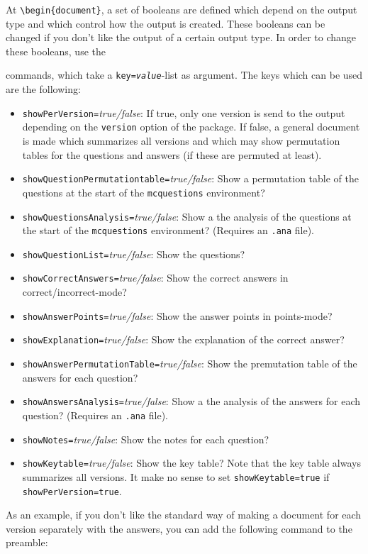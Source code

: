 \documentclass{article}
\begin{document}
At \verb$\begin{document}$, a set of booleans are defined which depend on the output type and which control how the output is created. These booleans can be changed if you don't like the output of a certain output type. In order to change these booleans, use the 
\begin{code}[commandchars=\!\?\;]
\end{code}
commands, which take a \texttt{key=\textit{value}}-list as argument. The keys which can be used are the following:
\begin{itemize}
\item \verb$showPerVersion=$\emph{true/false}: 
      If true, only one version is send to the output depending on the \verb$version$ option of the package. If false, a general document is made which summarizes all versions and which may show permutation tables for the questions and answers (if these are permuted at least). 
\item \verb$showQuestionPermutationtable=$\emph{true/false}:
      Show a permutation table of the questions at the start of the \verb$mcquestions$ environment?
\item \verb$showQuestionsAnalysis=$\emph{true/false}:
      Show a the analysis of the questions at the start of the \verb$mcquestions$ environment? (Requires an \verb$.ana$ file).
\item \verb$showQuestionList=$\emph{true/false}:
      Show the questions?
\item \verb$showCorrectAnswers=$\emph{true/false}:
      Show the correct answers in correct/incorrect-mode?
\item \verb$showAnswerPoints=$\emph{true/false}:
      Show the answer points in points-mode?
\item \verb$showExplanation=$\emph{true/false}:
      Show the explanation of the correct answer?
\item \verb$showAnswerPermutationTable=$\emph{true/false}:
      Show the premutation table of the answers for each question?
\item \verb$showAnswersAnalysis=$\emph{true/false}:
      Show a the analysis of the answers for each question? (Requires an \verb$.ana$ file).
\item \verb$showNotes=$\emph{true/false}:
      Show the notes for each question?
\item \verb$showKeytable=$\emph{true/false}:
      Show the key table? Note that the key table always summarizes all versions. It make no sense to set \verb$showKeytable=true$ if \verb$showPerVersion=true$.
\end{itemize}
As an example, if you don't like the standard way of making a document for each version separately with the answers, you can add the following command to the preamble:
\begin{code}[commandchars=\!\?\;]
\end{code}
\end{document}
